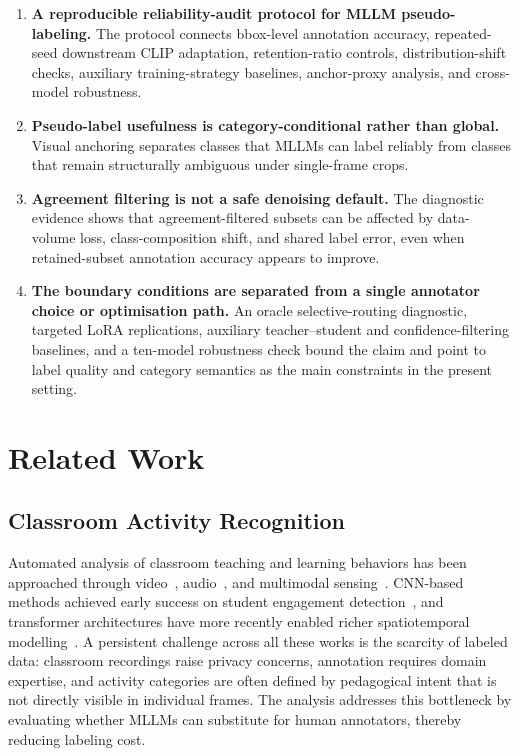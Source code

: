 \documentclass{ieeeaccess}
\begin{document}
\begin{enumerate}

  \item \textbf{A reproducible reliability-audit protocol for MLLM
  pseudo-labeling.}
  The protocol connects bbox-level annotation accuracy, repeated-seed
  downstream CLIP adaptation, retention-ratio controls,
  distribution-shift checks, auxiliary training-strategy baselines,
  anchor-proxy analysis, and cross-model robustness.

  \item \textbf{Pseudo-label usefulness is category-conditional rather
  than global.}
  Visual anchoring separates classes that MLLMs can label reliably
  from classes that remain structurally ambiguous under single-frame
  crops.

  \item \textbf{Agreement filtering is not a safe denoising default.}
  The diagnostic evidence shows that agreement-filtered subsets can be
  affected by data-volume loss, class-composition shift, and shared
  label error, even when retained-subset annotation accuracy appears to
  improve.

  \item \textbf{The boundary conditions are separated from a single
  annotator choice or optimisation path.}
  An oracle selective-routing diagnostic, targeted LoRA replications,
  auxiliary teacher--student and confidence-filtering baselines, and a
  ten-model robustness check bound the claim and point to label quality
  and category semantics as the main constraints in the present setting.

\end{enumerate}


\section{Related Work}
\label{sec:related}

\subsection{Classroom Activity Recognition}

Automated analysis of classroom teaching and learning behaviors has
been approached through video~\cite{whitehill2014automated},
audio~\cite{donnelly2017automatic}, and multimodal
sensing~\cite{dillenbourg2011classroom}.
CNN-based methods achieved early success on student engagement
detection~\cite{zhang2020classroom_cnn}, and transformer architectures
have more recently enabled richer spatiotemporal
modelling~\cite{li2022classroom_transformer}.
A persistent challenge across all these works is the scarcity of
labeled data: classroom recordings raise privacy concerns, annotation
requires domain expertise, and activity categories are often defined
by pedagogical intent that is not directly visible in individual
frames.
The analysis addresses this bottleneck by evaluating whether
MLLMs can substitute for human annotators, thereby reducing labeling
cost.
\end{document}
